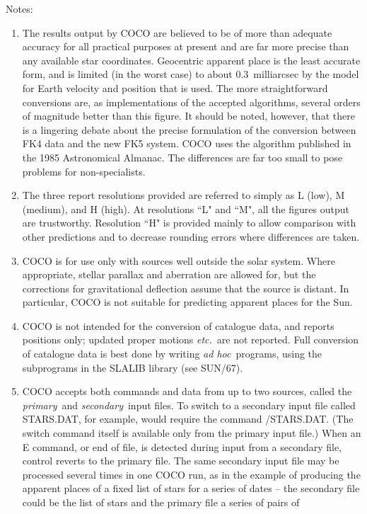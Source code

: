 Notes:
\begin{enumerate}
\item The results output by COCO are believed to be of more
than adequate accuracy for all practical purposes at
present and are far more precise than any
available star coordinates.
Geocentric apparent place
is the least accurate form,
and is limited (in the worst case) to about 0.3~milliarcsec
by the model for Earth velocity and position that is
used.
The more straightforward conversions are, as
implementations of the accepted algorithms, several
orders of magnitude better than this figure.
It should
be noted, however, that there is a lingering debate
about the precise formulation of the conversion between
FK4 data and the new FK5 system. COCO uses the algorithm
published in the 1985 Astronomical Almanac.
The differences are far too small to pose problems for non-specialists.
\item The three report resolutions provided are referred
to simply as L (low), M (medium),
and H (high).
At resolutions ``L" and ``M", all the
figures output are trustworthy.
Resolution ``H" is provided
mainly to allow comparison with other predictions and to
decrease rounding errors where differences are taken.
\item COCO is for use only with sources well outside the solar
system.
Where appropriate, stellar parallax and aberration
are allowed for, but the corrections for gravitational
deflection assume that the source is distant.
In particular, COCO is not suitable for predicting apparent places
for the Sun.
\item COCO is not intended for the conversion of catalogue data,
and reports positions only; updated proper motions {\it etc.}\
are not reported.
Full conversion of catalogue data is best done by writing
{\it ad hoc}\, programs, using the subprograms in the SLALIB
library (see SUN/67).
\item COCO accepts both commands and data from up to two
sources, called the {\it primary}\, and {\it secondary}\ input files.
To switch to a secondary input file called STARS.DAT, for
example, would require the command /STARS.DAT.
(The switch command itself is available only from the primary input file.) 
When an E command, or end of file, is detected during input from
a secondary file, control reverts to the primary file.
The same secondary input file may be processed several times in
one COCO run, as in the example of producing the apparent places of
a fixed list of stars for a series of dates -- the secondary file
could be the list of stars and the primary file a series of pairs of

\end{enumerate}
